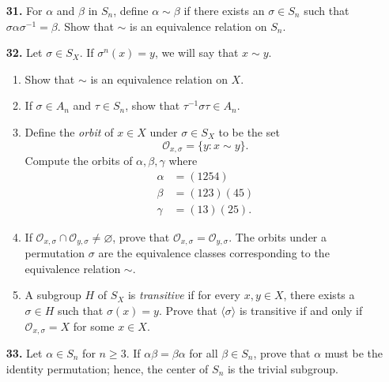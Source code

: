 \documentclass[12pt,reqno]{amsart}
\renewcommand{\emptyset}{\ensuremath{\varnothing}}
\newcommand{\boldemph}{\emph}
\newcommand{\probskip}{\vskip1cm}
\begin{document}
\begin{enumerate}[{\bf 1.}]
\probskip
 
 
\item[{\bf 31.}]  %
For $\alpha$ and $\beta$ in $S_n$, define $\alpha \sim \beta$ if there
exists an $\sigma \in S_n$ such that 
$\sigma \alpha \sigma^{-1} = \beta$.  Show that $\sim$ is an equivalence
relation on $S_n$. 
 
\probskip
 
 
\item[{\bf 32.}]  %
Let $\sigma \in S_X$. If $\sigma^n(x) = y$, we will say that 
$x \sim y$. 
\begin{enumerate}
 
 \item
Show that $\sim$ is an equivalence relation on $X$.
 
 \item
If $\sigma \in A_n$ and $\tau \in S_n$, show that 
$\tau^{-1} \sigma \tau \in A_n$. 
 
\item
Define the \boldemph{orbit} of $x \in X$ under $\sigma \in S_X$ to
be the set  
\[
{\mathcal O}_{x, \sigma} = \{ y : x \sim y  \}.
\]
Compute the orbits of $\alpha, \beta, \gamma$ where
\begin{align*}
\alpha & = (1254) \\
\beta & = (123)(45)\\
\gamma & = (13)(25).
\end{align*}
 
 \item
If ${\mathcal O}_{x, \sigma} \cap {\mathcal O}_{y, \sigma} \neq \emptyset$,
prove that ${\mathcal O}_{x, \sigma} = {\mathcal O}_{y, \sigma}$.  The orbits
under a permutation $\sigma$ are the equivalence classes corresponding
to the equivalence relation $\sim$.
 
 
\item
A subgroup $H$ of $S_X$ is \boldemph{
transitive} if for every $x, y \in X$, 
there exists a $\sigma \in H$ such that $\sigma(x) =y$. Prove that
$\langle \sigma \rangle$ is transitive if and only if 
${\mathcal O}_{x, \sigma} = X$ for some $x \in X$. 
 
 
\end{enumerate}
 
\probskip
 
 
\item[{\bf 33.}]  %
Let $\alpha \in S_n$ for $n \geq 3$. If $\alpha \beta = \beta \alpha$
for all $\beta \in S_n$, prove that $\alpha$ must be the identity
permutation; hence, the center of $S_n$ is the trivial subgroup. 
 
 
\end{enumerate}
\end{document}
